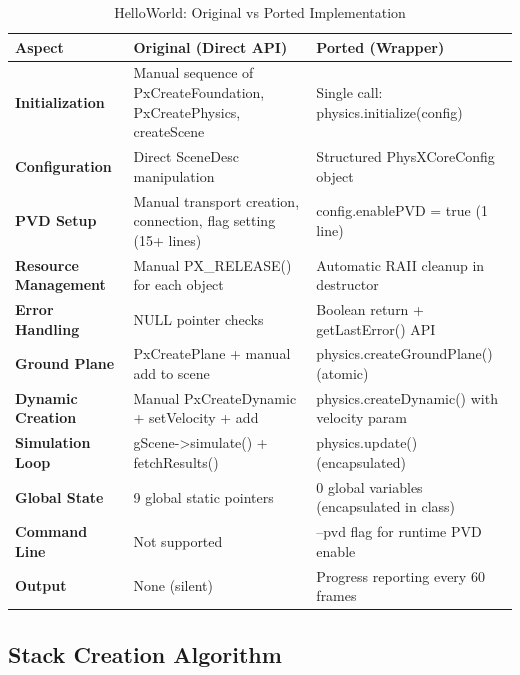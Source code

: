 \begin{table}[h]
\centering
\caption{HelloWorld: Original vs Ported Implementation}
\small
\begin{tabularx}{\textwidth}{|l|X|X|}
\hline
\textbf{Aspect} & \textbf{Original (Direct API)} & \textbf{Ported (Wrapper)} \\ \hline
\textbf{Initialization} &
Manual sequence of PxCreateFoundation, PxCreatePhysics, createScene &
Single call: physics.initialize(config) \\ \hline

\textbf{Configuration} &
Direct SceneDesc manipulation &
Structured PhysXCoreConfig object \\ \hline

\textbf{PVD Setup} &
Manual transport creation, connection, flag setting (15+ lines) &
config.enablePVD = true (1 line) \\ \hline

\textbf{Resource Management} &
Manual PX\_RELEASE() for each object &
Automatic RAII cleanup in destructor \\ \hline

\textbf{Error Handling} &
NULL pointer checks &
Boolean return + getLastError() API \\ \hline

\textbf{Ground Plane} &
PxCreatePlane + manual add to scene &
physics.createGroundPlane() (atomic) \\ \hline

\textbf{Dynamic Creation} &
Manual PxCreateDynamic + setVelocity + add &
physics.createDynamic() with velocity param \\ \hline

\textbf{Simulation Loop} &
gScene->simulate() + fetchResults() &
physics.update() (encapsulated) \\ \hline

\textbf{Global State} &
9 global static pointers &
0 global variables (encapsulated in class) \\ \hline

\textbf{Command Line} &
Not supported &
--pvd flag for runtime PVD enable \\ \hline

\textbf{Output} &
None (silent) &
Progress reporting every 60 frames \\ \hline
\end{tabularx}
\end{table}

\subsection{Stack Creation Algorithm}

